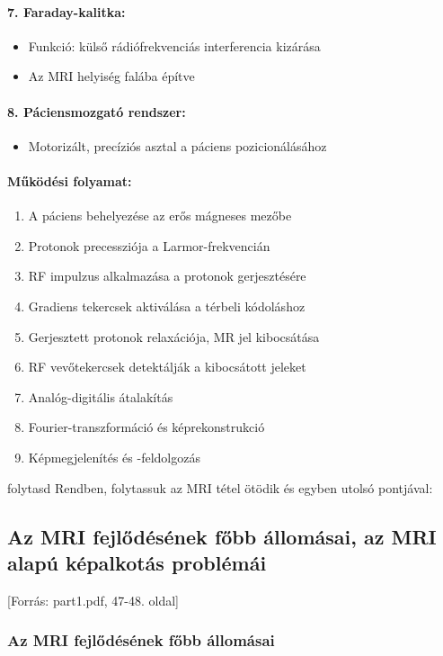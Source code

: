 \documentclass[a4paper,12pt]{article}
\begin{document}
\paragraph{7. Faraday-kalitka:} \begin{itemize} \item Funkció: külső rádiófrekvenciás interferencia kizárása \item Az MRI helyiség falába építve \end{itemize}

\paragraph{8. Páciensmozgató rendszer:} \begin{itemize} \item Motorizált, precíziós asztal a páciens pozicionálásához \end{itemize}

\paragraph{Működési folyamat:} \begin{enumerate} \item A páciens behelyezése az erős mágneses mezőbe \item Protonok precessziója a Larmor-frekvencián \item RF impulzus alkalmazása a protonok gerjesztésére \item Gradiens tekercsek aktiválása a térbeli kódoláshoz \item Gerjesztett protonok relaxációja, MR jel kibocsátása \item RF vevőtekercsek detektálják a kibocsátott jeleket \item Analóg-digitális átalakítás \item Fourier-transzformáció és képrekonstrukció \item Képmegjelenítés és -feldolgozás \end{enumerate}

folytasd
Rendben, folytassuk az MRI tétel ötödik és egyben utolsó pontjával:

\subsection{Az MRI fejlődésének főbb állomásai, az MRI alapú képalkotás problémái} [Forrás: part1.pdf, 47-48. oldal]

\subsubsection{Az MRI fejlődésének főbb állomásai}
\end{document}
